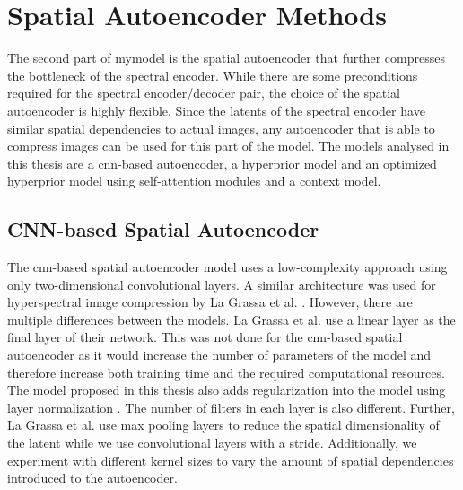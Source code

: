 \section{Spatial Autoencoder Methods\label{sec:spatialae}}
The second part of \ac{mymodel} is the spatial autoencoder that further compresses the bottleneck of the spectral encoder. While there are some preconditions required for the spectral encoder/decoder pair, the choice of the spatial autoencoder is highly flexible. Since the latents of the spectral encoder have similar spatial dependencies to actual images, any autoencoder that is able to compress images can be used for this part of the model. The models analysed in this thesis are a \ac{cnn}-based autoencoder, a hyperprior model and an optimized hyperprior model using self-attention modules and a context model.
\subsection{CNN-based Spatial Autoencoder\label{sec:conv2d}}
The \ac{cnn}-based spatial autoencoder model uses a low-complexity approach using only two-dimensional convolutional layers. A similar architecture was used for hyperspectral image compression by La Grassa et al. \citep{la_grassa_hyperspectral_2022}. However, there are multiple differences between the models. La Grassa et al. use a linear layer as the final layer of their network. This was not done for the \ac{cnn}-based spatial autoencoder as it would increase the number of parameters of the model and therefore increase both training time and the required computational resources. The model proposed in this thesis also adds regularization into the model using layer normalization \citep{ba_layer_2016}. The number of filters in each layer is also different. Further, La Grassa et al. use max pooling layers to reduce the spatial dimensionality of the latent while we use convolutional layers with a stride. Additionally, we experiment with different kernel sizes to vary the amount of spatial dependencies introduced to the autoencoder.

